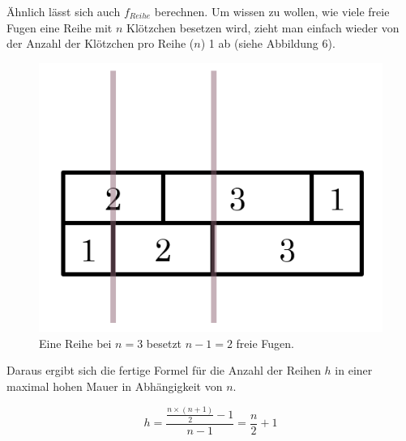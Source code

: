 \documentclass[a4paper,12pt]{article}
\begin{document}
Ähnlich lässt sich auch $f_{Reihe}$ berechnen. Um wissen zu wollen, wie viele freie Fugen eine Reihe mit $n$ Klötzchen besetzen wird, zieht man einfach wieder von der Anzahl der Klötzchen pro Reihe ($n$) 1 ab (siehe Abbildung 6).
\begin{figure}[H]
    \centering
    \includegraphics[width=0.5\linewidth]{Bilder/Aufgabe1/Definition_Fugenstellen_Reihe.png}
    \caption{Eine Reihe bei $n = 3$ besetzt $n-1 = 2$ freie Fugen.}
\end{figure}

Daraus ergibt sich die fertige Formel für die Anzahl der Reihen $h$ in einer maximal hohen Mauer in Abhängigkeit von $n$.
\begin{center}
\begin{Large}
\[h = \frac{\frac{n\times(n+1)}{2}-1}{n-1} = \frac{n}{2}+1\]
\end{Large}
\end{center}


\end{document}
